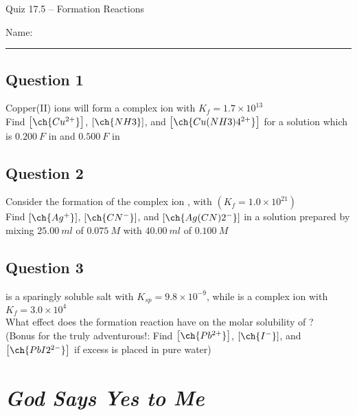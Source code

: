 \documentclass[11pt, letterpaper]{memoir}
\begin{document}
	\begin{center}
		{\large	Quiz 17.5 -- Formation Reactions}
	\end{center}
	{\large Name: \rule[-1mm]{4in}{.1pt} 

\subsection*{Question 1}
Copper(II) ions will form a  complex ion with $K_f=1.7\times10^{13}$\\
Find $\left[\ch{Cu^{2+}}\right]$, $\left[\ch{NH3}\right]$, and $\left[\ch{Cu(NH3)4^{2+}}\right]$ for a solution which is $0.200~F$ in  and $0.500~F$ in 

\vspace{10em}
\subsection*{Question 2}
Consider the formation of the complex ion , with $\left( K_f=1.0\times10^{21}\right)$ \\Find $\left[\ch{Ag^+}\right]$, $\left[\ch{CN^-}\right]$, and $\left[\ch{Ag(CN)2^-}\right]$ in a solution prepared by mixing $25.00~ml$ of $0.075~M$  with $40.00~ml$ of $0.100~M$ 

\vspace{12 em}
\subsection*{Question 3}
 is a sparingly soluble salt with $K_{sp}=9.8\times10^{-9}$, while  is a complex ion with $K_f=3.0\times10^4$\\
What effect does the formation reaction have on the molar solubility of ?\\
(Bonus for the truly adventurous!: Find $\left[\ch{Pb^{2+}}\right]$, $\left[\ch{I^-}\right]$, and $\left[\ch{PbI2^{2-}}\right]$ if excess  is placed in pure water)
	\newpage
	\pagestyle{empty}
	\addtocounter{page}{-1}
\section*{\emph{God Says Yes to Me}}
}
\end{document}
